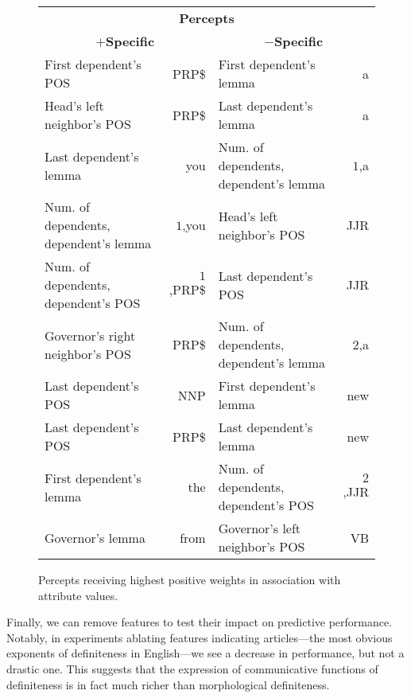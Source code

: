 \documentclass[11pt,letterpaper]{article}
\begin{document}
\begin{figure}\small\centering
   \begin{tabular}{lr|lr}
      \multicolumn{4}{c}{\bf Percepts} \\
\multicolumn{2}{c}{\bf $+$Specific} & \multicolumn{2}{c}{\bf $-$Specific} \\
First dependent's POS & PRP\$ & First dependent's lemma & a \\
Head's left neighbor's POS & PRP\$ & Last dependent's lemma & a \\
Last dependent's lemma & you & Num. of dependents, dependent's lemma & $1$,a \\
Num. of dependents, dependent's lemma & $1$,you & Head's left neighbor's POS & JJR \\
Num. of dependents, dependent's POS & $1$,PRP\$ & Last dependent's POS & JJR \\
Governor's right neighbor's POS & PRP\$ & Num. of dependents, dependent's lemma & $2$,a \\
Last dependent's POS & NNP & First dependent's lemma & new \\
Last dependent's POS & PRP\$ & Last dependent's lemma & new \\
First dependent's lemma & the & Num. of dependents, dependent's POS & $2$,JJR \\
Governor's lemma & from & Governor's left neighbor's POS & VB \\
\end{tabular}
\caption{Percepts receiving highest positive weights in association with attribute values.}
\label{fig:weights}
\end{figure}

Finally, we can remove features to test their impact on predictive performance. 
Notably, in experiments ablating features indicating articles---the most obvious exponents of definiteness 
in English---we see a decrease in performance, but not a drastic one. 
This suggests that the expression of communicative functions of definiteness is in fact much richer than 
morphological definiteness.
\end{document}
